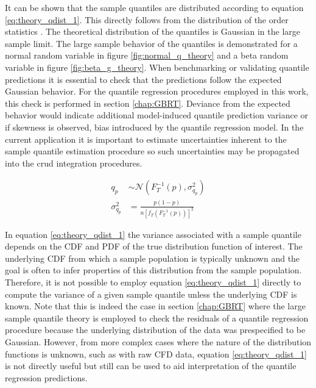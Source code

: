 It can be shown that the sample quantiles are distributed according to equation \ref{eq:theory_qdist_1}.  This directly follows from the distribution of the order statistics \cite{mosteller1946}.  The theoretical distribution of the quantiles is Gaussian in the large sample limit.  The large sample behavior of the quantiles is demonstrated for a normal random variable in figure \ref{fig:normal_q_theory} and a beta random variable in figure \ref{fig:beta_g_theory}.  When benchmarking or validating quantile predictions it is essential to check that the predictions follow the expected Gaussian behavior.  For the quantile regression procedures employed in this work, this check is performed in section \ref{chap:GBRT}.  Deviance from the expected behavior would indicate additional model-induced quantile prediction variance or if skewness is observed, bias introduced by the quantile regression model.  In the current application it is important to estimate uncertainties inherent to the sample quantile estimation procedure so such uncertainties may be propagated into the crud integration procedures.

\begin{align}
    q_p &\sim \mathcal N \left( F_T^{-1}(p), \sigma^2_{q_p} \right) \nonumber \\
    \sigma^2_{q_p} &= \frac{p(1 - p)}{n[f_T(F_T^{-1}(p))]^2}
    \label{eq:theory_qdist_1}
\end{align}

In equation \ref{eq:theory_qdist_1} the variance associated with a sample quantile depends on the CDF and PDF of the true distribution function of interest.  The underlying CDF from which a sample population is typically unknown and the goal is often to infer properties of this distribution from the sample population.  Therefore, it is not possible to employ equation \ref{eq:theory_qdist_1} directly to compute the variance of a given sample quantile unless the underlying CDF is known.  Note that this is indeed the case in section \ref{chap:GBRT} where the large sample quantile theory is employed to check the residuals of a quantile regression procedure because the underlying distribution of the data was prespecified to be Gaussian.  However, from more complex cases where the nature of the distribution functions is unknown, such as with raw CFD data, equation  \ref{eq:theory_qdist_1} is not directly useful but still can be used to aid interpretation of the quantile regression predictions.

